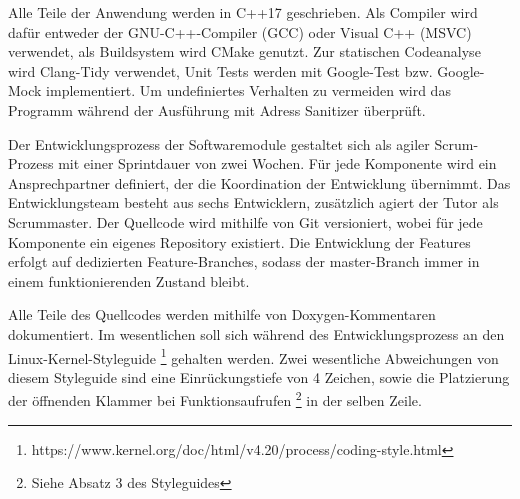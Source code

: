 Alle Teile der Anwendung werden in C++17 geschrieben. Als Compiler wird dafür entweder der GNU-C++-Compiler (GCC) oder Visual C++ (MSVC) verwendet, als Buildsystem wird CMake genutzt.
Zur statischen Codeanalyse wird Clang-Tidy verwendet, Unit Tests werden mit Google-Test bzw. Google-Mock implementiert.
Um undefiniertes Verhalten zu vermeiden wird das Programm während der Ausführung mit Adress Sanitizer überprüft.

Der Entwicklungsprozess der Softwaremodule gestaltet sich als agiler Scrum-Prozess mit einer Sprintdauer von zwei Wochen. Für jede Komponente wird ein Ansprechpartner definiert, der die Koordination der Entwicklung übernimmt.
Das Entwicklungsteam besteht aus sechs Entwicklern, zusätzlich agiert der Tutor als Scrummaster. Der Quellcode wird mithilfe von Git versioniert, wobei für jede Komponente ein eigenes Repository existiert. Die Entwicklung der Features erfolgt auf dedizierten Feature-Branches, sodass der master-Branch immer in einem funktionierenden Zustand bleibt.

Alle Teile des Quellcodes werden mithilfe von Doxygen-Kommentaren dokumentiert. Im wesentlichen soll sich während des Entwicklungsprozess an den Linux-Kernel-Styleguide \footnote{https://www.kernel.org/doc/html/v4.20/process/coding-style.html} gehalten werden. Zwei wesentliche Abweichungen von diesem Styleguide sind eine Einrückungstiefe von 4 Zeichen, sowie die Platzierung der öffnenden Klammer bei Funktionsaufrufen \footnote{Siehe Absatz 3 des Styleguides} in der selben Zeile.

